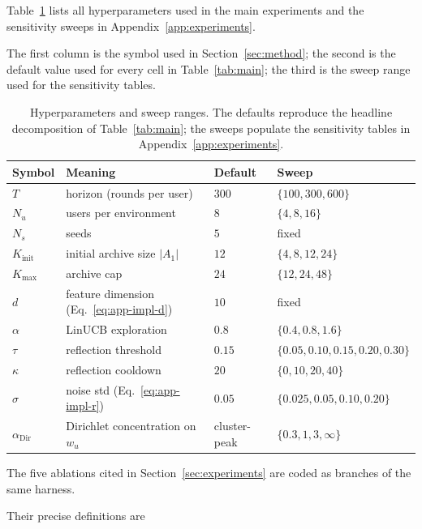 \documentclass{article} %
\begin{document}
\label{app:impl-hparams}

Table~\ref{tab:app-impl-hparams} lists all hyperparameters used in the main experiments and the sensitivity sweeps in Appendix~\ref{app:experiments}.

The first column is the symbol used in Section~\ref{sec:method}; the second is the default value used for every cell in Table~\ref{tab:main}; the third is the sweep range used for the sensitivity tables.

\begin{table}[h]
\centering
\small
\begin{tabular}{llll}
\toprule
Symbol & Meaning & Default & Sweep \\
\midrule
$T$ & horizon (rounds per user) & $300$ & $\{100, 300, 600\}$ \\
$N_u$ & users per environment & $8$ & $\{4, 8, 16\}$ \\
$N_s$ & seeds & $5$ & fixed \\
$K_{\text{init}}$ & initial archive size $|A_1|$ & $12$ & $\{4, 8, 12, 24\}$ \\
$K_{\max}$ & archive cap & $24$ & $\{12, 24, 48\}$ \\
$d$ & feature dimension (Eq.~\eqref{eq:app-impl-d}) & $10$ & fixed \\
$\alpha$ & LinUCB exploration & $0.8$ & $\{0.4, 0.8, 1.6\}$ \\
$\tau$ & reflection threshold & $0.15$ & $\{0.05, 0.10, 0.15, 0.20, 0.30\}$ \\
$\kappa$ & reflection cooldown & $20$ & $\{0, 10, 20, 40\}$ \\
$\sigma$ & noise std (Eq.~\eqref{eq:app-impl-r}) & $0.05$ & $\{0.025, 0.05, 0.10, 0.20\}$ \\
$\alpha_{\mathrm{Dir}}$ & Dirichlet concentration on $w_u$ & cluster-peak & $\{0.3, 1, 3, \infty\}$ \\
\bottomrule
\end{tabular}
\caption{Hyperparameters and sweep ranges. The defaults reproduce the headline decomposition of Table~\ref{tab:main}; the sweeps populate the sensitivity tables in Appendix~\ref{app:experiments}.}
\label{tab:app-impl-hparams}
\end{table}

The five ablations cited in Section~\ref{sec:experiments} are coded as branches of the same harness.

Their precise definitions are
\end{document}
